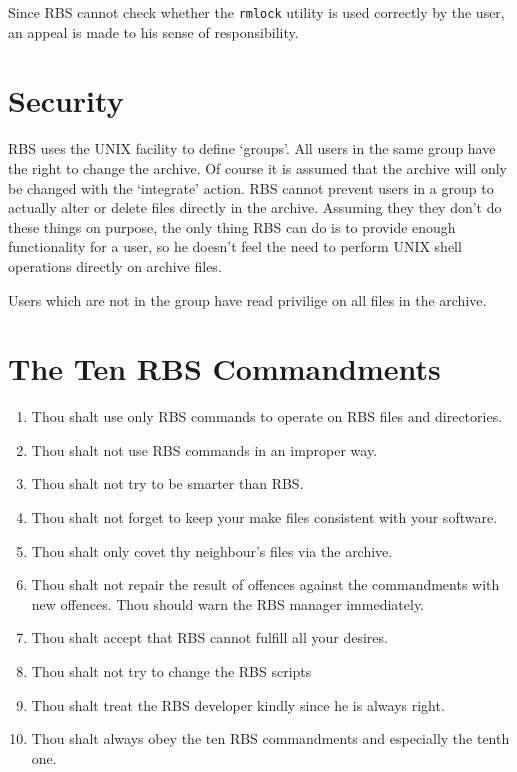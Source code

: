 Since RBS cannot check whether the \verb+rmlock+ utility is used correctly by the
user, an appeal is made to his sense of responsibility.


\section{Security}

RBS uses the UNIX facility to define `groups'. All users in the same group
have the right to change the archive. Of course it is assumed that the archive
will only be changed with the `integrate' action. RBS cannot prevent users
in a group to actually alter or delete files directly in the archive. Assuming
they they don't do these things on purpose, the only thing RBS can do is
to provide enough functionality for a user, so he doesn't feel the need
to perform UNIX shell operations directly on archive files.

Users which are not in the group have read privilige on all files in the
archive.


\section{The Ten RBS Commandments}
\begin{enumerate}
\item Thou shalt use only RBS commands to operate on RBS files and directories.
\item Thou shalt not use RBS commands in an improper way.
\item Thou shalt not try to be smarter than RBS.
\item Thou shalt not forget to keep your make files consistent with your software.
\item Thou shalt only covet thy neighbour's files via the archive.
\item Thou shalt not repair the result of offences against the commandments with
    new offences. Thou should warn the RBS manager immediately.
\item Thou shalt accept that RBS cannot fulfill all your desires.
\item Thou shalt not try to change the RBS scripts
\item Thou shalt treat the RBS developer kindly since he is always right.
\item Thou shalt always obey the ten RBS commandments and especially the tenth
    one.
\end{enumerate}
